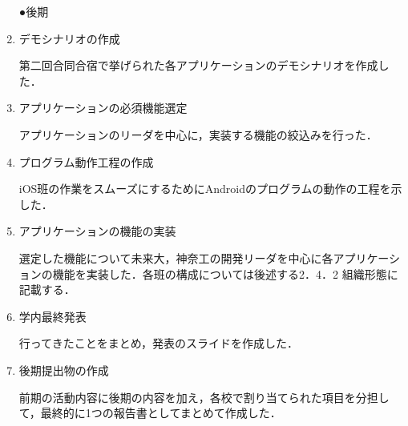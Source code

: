 \begin{enumerate}
\par ●後期
\item デモシナリオの作成
\par 第二回合同合宿で挙げられた各アプリケーションのデモシナリオを作成した．
\item アプリケーションの必須機能選定
\par アプリケーションのリーダを中心に，実装する機能の絞込みを行った．
\item プログラム動作工程の作成
\par iOS班の作業をスムーズにするためにAndroidのプログラムの動作の工程を示した．
\item アプリケーションの機能の実装
\par 選定した機能について未来大，神奈工の開発リーダを中心に各アプリケーションの機能を実装した．各班の構成については後述する2．4．2 組織形態に記載する．
\item 学内最終発表
\par 行ってきたことをまとめ，発表のスライドを作成した．
\item 後期提出物の作成
\par 前期の活動内容に後期の内容を加え，各校で割り当てられた項目を分担して，最終的に1つの報告書としてまとめて作成した．
\end{enumerate}

